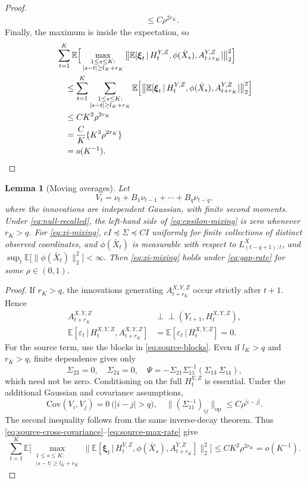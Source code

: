 \documentclass[12pt]{article}
\def\E{\mathbb{E}}
\newtheorem{lemma}[theorem]{Lemma}
\newcommand{\indep}{\perp \!\!\! \perp}
\newcommand{\Cov}{\mathrm{Cov}}
\newcommand\given{\,|\,}
\numberwithin{equation}{section}
\begin{document}
\begin{proof}
\begin{align}
 &\quad\leq C\rho^{2r_K}.
\end{align}
Finally, the maximum is inside the expectation, so
\begin{align}\label{eq:source-max-rate}
 &\sum_{t=1}^K\E \Big[
 \max_{\substack{1\leq s\leq K:\\|s-t|\geq l_K+r_K}}
 \big\|\E[\boldsymbol\xi_t\given H_t^{Y,Z},
             \phi(\bar X_s),A_{t+r_K}^{Y,Z}]\big\|_2^2\Big]\notag\\
 &\quad\leq\sum_{t=1}^K
 \sum_{\substack{1\leq s\leq K:\\|s-t|\geq l_K+r_K}}
 \E \Big[\big\|\E[\boldsymbol\xi_t\given H_t^{Y,Z},
             \phi(\bar X_s),A_{t+r_K}^{Y,Z}]\big\|_2^2\Big]\notag\\
 &\quad\leq CK^2\rho^{2r_K} \notag\\
 &\quad=\frac{C}{K}\{K^3\rho^{2r_K}\}\notag\\
 &\quad =o(K^{-1}).
\end{align}
\end{proof}

\begin{lemma}[Moving averages]
\label{lem:gaussian-ma-short-memory}
Let
\[
 V_t=\nu_t+B_1\nu_{t-1}+\cdots+B_q\nu_{t-q},
\]
where the innovations are independent Gaussian, with finite second moments.
Under \eqref{eq:null-recalled}, the left-hand side of
\eqref{eq:epsilon-mixing} is zero whenever $r_K>q$.
For \eqref{eq:xi-mixing}, $cI\preceq\Sigma\preceq CI$ uniformly for finite collections of
distinct observed coordinates, and $\phi(\bar X_t)$ is measurable with respect to $L^X_{(t-q+1):t}$, and $\sup_t\E\big[\|\phi(\bar X_t)\|_2^2\big]<\infty.$
Then \eqref{eq:xi-mixing} holds under \eqref{eq:gap-rate} for some
$\rho\in(0,1)$. 
\end{lemma}

\begin{proof}
If $r_K>q$, the innovations generating $A_{t+r_K}^{X,Y,Z}$ occur strictly
after $t+1$. Hence
\begin{align*}
 A_{t+r_K}^{X,Y,Z}& \indep (Y_{t+1},H_t^{X,Y,Z}),\\
 \E[\varepsilon_t\given H_t^{X,Y,Z},A_{t+r_K}^{X,Y,Z}]
 &=\E[\varepsilon_t\given H_t^{X,Y,Z}]=0.
\end{align*}
For the source term, use the blocks in \eqref{eq:source-blocks}. Even if
$l_K>q$ and $r_K>q$, finite dependence gives only
\[
 \Sigma_{23}=0,\quad \Sigma_{24}=0,\quad
 \Psi=-\Sigma_{21}\Sigma_{11}^{-1}(\Sigma_{13}\ \Sigma_{14}),
\]
which need not be zero. Conditioning on the full $H_t^{Y,Z}$ is essential.
Under the additional Gaussian and covariance assumptions,
\[
 \Cov(V_i,V_j)=0~ \big(|i-j|>q\big),\quad
 \|(\Sigma_{11}^{-1})_{ij}\|_{\mathrm{op}}\leq C\rho^{|i-j|}.
\]
The second inequality follows from the same inverse-decay theorem.
Thus \eqref{eq:source-cross-covariance}--\eqref{eq:source-max-rate} give
\[
 \sum_{t=1}^K\E\Big[
 \max_{\substack{1\leq s\leq K:\\|s-t|\geq l_K+r_K}}
 \big\|\E[\boldsymbol\xi_t\given H_t^{Y,Z},
                  \phi(\bar X_s),A_{t+r_K}^{Y,Z}]\big\|_2^2\Big]
 \leq CK^2\rho^{2r_K}=o(K^{-1}).
\]
\end{proof}
\end{document}
